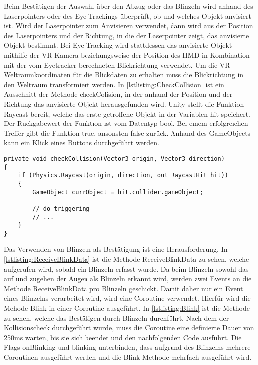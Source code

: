 Beim Bestätigen der Auswahl über den Abzug oder das Blinzeln wird anhand des Laserpointers oder des Eye-Trackings überprüft, ob und welches Objekt anvisiert ist. Wird der Laserpointer zum Anvisieren verwendet, dann wird aus der Position des Laserpointers und der Richtung, in die der Laserpointer zeigt, das anvisierte Objekt bestimmt. Bei Eye-Tracking wird stattdessen das anvisierte Objekt mithilfe der \ac{VR}-Kamera beziehungsweise der Position des \ac{HMD} in Kombination mit der vom Eyetracker berechneten Blickrichtung verwendet. Um die \ac{VR}-Weltraumkoordinaten für die Blickdaten zu erhalten muss die Blickrichtung in den Weltraum transformiert werden. In \autoref{lstlisting:CheckCollision} ist ein Ausschnitt der Methode checkColision, in der anhand der Position und der Richtung das anvisierte Objekt herausgefunden wird. Unity stellt die Funktion Raycast bereit, welche das erste getroffene Objekt in der Variablen hit speichert. Der Rückgabewert der Funktion ist vom Datentyp bool. Bei einem erfolgreichen Treffer gibt die Funktion true, ansonsten false zurück. Anhand des GameObjects kann ein Klick eines Buttons durchgeführt werden.

\begin{lstlisting}[caption=Ausschnitt aus Methode checkCollision,label=lstlisting:CheckCollision]
private void checkCollision(Vector3 origin, Vector3 direction)
{
	if (Physics.Raycast(origin, direction, out RaycastHit hit))
	{
		GameObject currObject = hit.collider.gameObject;
		
		// do triggering
		// ...
	}
}
\end{lstlisting}

Das Verwenden von Blinzeln als Bestätigung ist eine Herausforderung. In \autoref{lstlisting:ReceiveBlinkData} ist die Methode ReceiveBlinkData zu sehen, welche aufgerufen wird, sobald ein Blinzeln erfasst wurde. Da beim Blinzeln sowohl das auf und zugehen der Augen als Blinzeln erkannt wird, werden zwei Events an die Methode ReceiveBlinkData pro Blinzeln geschickt. Damit daher nur ein Event eines Blinzelns verarbeitet wird, wird eine Coroutine verwendet. Hierfür wird die Mehode Blink in einer Coroutine ausgeführt. In \autoref{lstlisting:Blink} ist die Methode zu sehen, welche das Bestätigen durch Blinzeln durchführt. Nach dem der Kollisionscheck durchgeführt wurde, muss die Coroutine eine definierte Dauer von 250ms warten, bis sie sich beendet und den nachfolgenden Code ausführt. Die Flags {\ttfamily onBlinking} und {\ttfamily blinking} unterbinden, dass aufgrund des Blinzelns mehrere Coroutinen ausgeführt werden und die Blink-Methode mehrfach ausgeführt wird.

